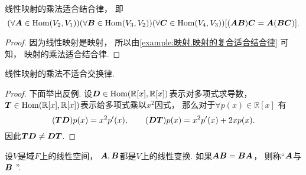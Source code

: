 \begin{proposition}\label{theorem:线性映射.线性映射的乘法适合结合律}
线性映射的乘法适合结合律，
即\begin{equation*}
	(\forall\boldsymbol{A}\in\operatorname{Hom}(V_2,V_1))
	(\forall\boldsymbol{B}\in\operatorname{Hom}(V_3,V_2))
	(\forall\boldsymbol{C}\in\operatorname{Hom}(V_4,V_3))
	[
		(\boldsymbol{A}\boldsymbol{B})\boldsymbol{C}
		= \boldsymbol{A}(\boldsymbol{B}\boldsymbol{C})
	].
\end{equation*}
\begin{proof}
因为线性映射是映射，
所以由\cref{example:映射.映射的复合适合结合律} 可知，
映射的乘法适合结合律.
\end{proof}
\end{proposition}
\begin{proposition}\label{theorem:线性映射.线性映射的乘法不适合交换律}
线性映射的乘法不适合交换律.
\begin{proof}
下面举出反例.
\def\MyPolynomialRing{\mathbb{R}[x]}%
\def\MyLinearMapSpace{\Hom(\MyPolynomialRing,\MyPolynomialRing)}%
设\(\vb{D}\in\MyLinearMapSpace\)表示对多项式求导数，
\(\vb{T}\in\MyLinearMapSpace\)表示给多项式乘以\(x^2\)因式，
那么对于\(\forall p(x) \in \MyPolynomialRing\)
有\begin{equation*}
	(\boldsymbol{T}\boldsymbol{D})p(x)
	= x^2 p'(x),
	\qquad
	(\boldsymbol{D}\boldsymbol{T})p(x)
	= x^2 p'(x) + 2x p(x).
\end{equation*}
因此\(\boldsymbol{T}\boldsymbol{D} \neq \boldsymbol{D}\boldsymbol{T}\).
\end{proof}
\end{proposition}
\begin{definition}
设\(V\)是域\(F\)上的线性空间，
\(\boldsymbol{A},\boldsymbol{B}\)都是\(V\)上的线性变换.
如果\(\boldsymbol{A}\boldsymbol{B}=\boldsymbol{B}\boldsymbol{A}\)，
则称“\(\boldsymbol{A}\)与\(\boldsymbol{B}\) ”.
\end{definition}

